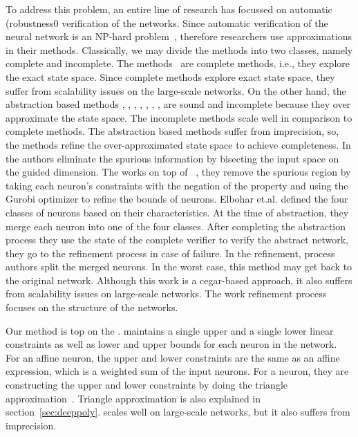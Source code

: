 To address this problem, an entire line of research has focussed on automatic (robustness0 verification of the networks. Since automatic verification of the neural network is an NP-hard problem~\cite{?}, therefore researchers use approximations in their methods. Classically, we may divide the methods into two classes, namely complete and incomplete. The methods~\cite{lomuscio2017approach,fischetti2018deep,dutta2018output,cheng2017maximum,katz2017reluplex,katz2019marabou,ehlers2017formal,huang2017safety,wang2021beta,xu2020fast,zhang2022general,alpha} are complete methods, i.e., they explore the exact state space.
Since complete methods explore exact state space, they suffer from scalability issues on the large-scale networks. On the other hand, the abstraction based methods \cite{dvijotham2018dual}, \cite{gehr2018ai2}, \cite{singh2018fast},
 \cite{singh2018boosting}, \cite{weng2018towards}, \cite{wong2018provable}, \cite{zhang2018efficient}, \cite{zhang2018efficient} are sound and incomplete because they over approximate the state space. The incomplete methods scale well in comparison to complete methods.  The abstraction based methods suffer from imprecision, so, the methods \cite{wang2018formal,wang2018efficient,elboher2020abstraction,yang2021improving,lin2020art} refine the over-approximated state space to achieve completeness. In \cite{wang2018formal,wang2018efficient,lin2020art} the authors eliminate the spurious information by bisecting the input space on the guided dimension. The \cite{yang2021improving} works on top of \deeppoly{}~\cite{singh2019abstract}, they remove
the spurious region by taking each neuron's constraints with the negation of the property and using the  Gurobi optimizer \cite{gurobioptimizer} to refine the bounds of neurons. Elbohar et.al. \cite{elboher2020abstraction} defined the four classes of neurons based on their characteristics. At the time of abstraction, they merge each neuron into one of the four classes.  After completing the abstraction process they use the state of the complete verifier to verify  the abstract network, they go to the refinement process in case of failure.   In the refinement, process authors split the merged neurons.  In the worst case, this method may get back to the original network.  Although this work is a cegar-based approach, it also suffers from scalability issues on large-scale networks.   The work \cite{elboher2020abstraction} refinement process focuses on the structure of the networks.

Our method is top on the \deeppoly{}.  \deeppoly{} maintains a single upper and a single lower linear constraints as well as lower and upper bounds
for each neuron in the network. For an affine neuron, the upper and lower constraints are the same as an affine expression, 
which is a weighted sum of the input neurons. For a \relu{} neuron, they are constructing the upper and lower constraints
by doing the triangle approximation~\cite{singh2019abstract}. 
Triangle approximation is also explained in section~\ref{sec:deeppoly}. 
\deeppoly{} scales well on large-scale networks, but it also suffers from imprecision. 

